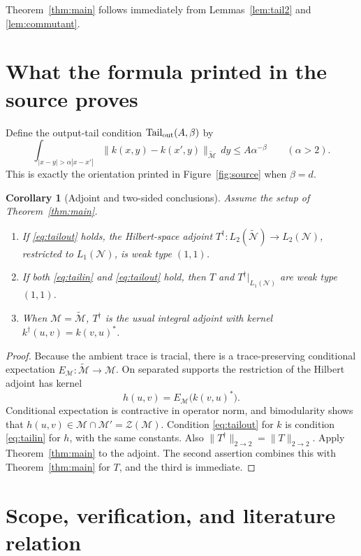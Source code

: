 \documentclass[11pt]{article}
\newtheorem{corollary}[theorem]{Corollary}
\newcommand{\M}{\mathcal M}
\newcommand{\Mt}{\widetilde{\mathcal M}}
\newcommand{\N}{\mathcal N}
\newcommand{\Nt}{\widetilde{\mathcal N}}
\begin{document}
Theorem~\ref{thm:main} follows immediately from
Lemmas~\ref{lem:tail2} and \ref{lem:commutant}.

\section{What the formula printed in the source proves}

Define the output-tail condition $\mathrm{Tail}_{\rm out}(A,\beta)$ by
\begin{equation}\label{eq:tailout}
 \int_{|x-y|>\alpha|x-x'|}
 \|k(x,y)-k(x',y)\|_{\Mt}\,dy
 \le A\alpha^{-\beta}
 \qquad(\alpha>2).
\end{equation}
This is exactly the orientation printed in Figure~\ref{fig:source} when
$\beta=d$.

\begin{corollary}[Adjoint and two-sided conclusions]\label{cor:orientation}
Assume the setup of Theorem~\ref{thm:main}.
\begin{enumerate}
\item If \eqref{eq:tailout} holds, the Hilbert-space adjoint
$T^\dagger:L_2(\Nt)\to L_2(\N)$, restricted to $L_1(\N)$, is weak type
$(1,1)$.
\item If both \eqref{eq:tailin} and \eqref{eq:tailout} hold, then $T$ and
$T^\dagger|_{L_1(\N)}$ are weak type $(1,1)$.
\item When $\M=\Mt$, $T^\dagger$ is the usual integral adjoint with kernel
$k^\dagger(u,v)=k(v,u)^*$.
\end{enumerate}
\end{corollary}

\begin{proof}
Because the ambient trace is tracial, there is a trace-preserving conditional
expectation $E_\M:\Mt\to\M$.  On separated supports the restriction of the
Hilbert adjoint has kernel
\[
 h(u,v)=E_\M\bigl(k(v,u)^*\bigr).
\]
Conditional expectation is contractive in operator norm, and bimodularity
shows that $h(u,v)\in\M\cap\M'=\mathcal Z(\M)$.  Condition
\eqref{eq:tailout} for $k$ is condition \eqref{eq:tailin} for $h$, with the
same constants.  Also $\|T^\dagger\|_{2\to2}=\|T\|_{2\to2}$.  Apply
Theorem~\ref{thm:main} to the adjoint.  The second assertion combines this
with Theorem~\ref{thm:main} for $T$, and the third is immediate.
\end{proof}

\section{Scope, verification, and literature relation}
\end{document}
